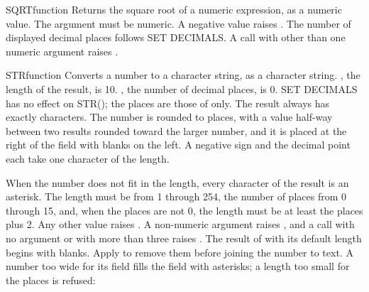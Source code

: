 \begin{XbaseEntry}{SQRT}{function}
Returns the square root of a numeric expression, as a numeric value.
\Syntax
{}
\Usage
The argument must be numeric. A negative value raises
. The number of displayed decimal places follows
SET DECIMALS. A call with other than one numeric argument raises
.
\Examples
{}
\end{XbaseEntry}

\begin{XbaseEntry}{STR}{function}
Converts a number to a character string, as a character string.
\Syntax
{}
\Defaults
{}, the length of the result, is 10. , the number of decimal places, is 0. SET DECIMALS has no effect on STR(); the places are those of  only.
\Usage
The result always has exactly  characters. The number is rounded to  places, with a value half-way between two results rounded toward the larger number, and it is placed at the right of the field with blanks on the left. A negative sign and the decimal point each take one character of the length.

When the number does not fit in the length, every character of the result is an asterisk. The length must be from 1 through 254, the number of places from 0 through 15, and, when the places are not 0, the length must be at least the places plus 2. Any other value raises . A non-numeric argument raises , and a call with no argument or with more than three raises .
\Tips
The result of  with its default length begins with blanks. Apply  to remove them before joining the number to text.
\Examples
{}
A number too wide for its field fills the field with asterisks; a length too small for the places is refused:
\end{XbaseEntry}

